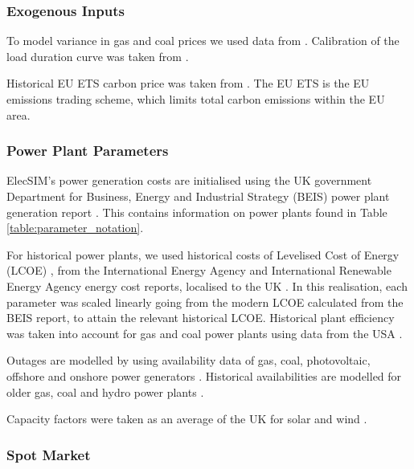 \subsubsection{Exogenous Inputs}

To model variance in gas and coal prices we used data from \cite{coalprices,gasprices}. Calibration of the load duration curve was taken from \cite{gbnationalgridstatus_2019}.

Historical EU ETS carbon price was taken from \cite{jones_moore_macdonald_macdonald_buckley_macdonald_2019}. The EU ETS is the EU emissions trading scheme, which limits total carbon emissions within the EU area.

\subsubsection{Power Plant Parameters}

ElecSIM's power generation costs are initialised using the UK government Department for Business, Energy and Industrial Strategy (BEIS) power plant generation report \cite{Department2016}. This contains information on power plants found in Table \ref{table:parameter_notation}.

For historical power plants, we used historical costs of Levelised Cost of Energy (LCOE) \cite{Dale2013}, from the International Energy Agency and International Renewable Energy Agency energy cost reports, localised to the UK \cite{IEA2015,IRENA2018}. In this realisation, each parameter was scaled linearly going from the modern LCOE calculated from the BEIS report, to attain the relevant historical LCOE. Historical plant efficiency was taken into account for gas and coal power plants using data from the USA \cite{EIA2013}.

Outages are modelled by using availability data of gas, coal, photovoltaic, offshore and onshore power generators \cite{Ltd2016, Hunt2015, carroll-j}. Historical availabilities are modelled for older gas, coal and hydro power plants \cite{AlbertaSystemElectricOperator2016}.

Capacity factors were taken as an average of the UK for solar and wind \cite{Pfenninger2016, Staffell2016}.






\subsubsection{Spot Market}

